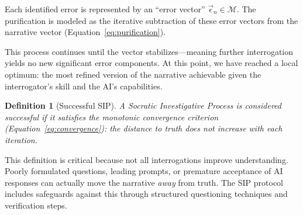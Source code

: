 \documentclass[11pt,a4paper]{article}
\newtheorem{definition}{Definition}[section]
\begin{document}
\begin{small}
Each identified error is represented by an ``error vector'' $\vec{\epsilon}_n \in \mathcal{M}$. The purification is modeled as the iterative subtraction of these error vectors from the narrative vector (Equation~\ref{eq:purification}).

This process continues until the vector stabilizes---meaning further interrogation yields no new significant error components. At this point, we have reached a local optimum: the most refined version of the narrative achievable given the interrogator's skill and the AI's capabilities.

\begin{definition}[Successful SIP]
A Socratic Investigative Process is considered successful if it satisfies the monotonic convergence criterion (Equation~\ref{eq:convergence}): the distance to truth does not increase with each iteration.
\end{definition}


This definition is critical because not all interrogations improve understanding. Poorly formulated questions, leading prompts, or premature acceptance of AI responses can actually move the narrative \textit{away} from truth. The SIP protocol includes safeguards against this through structured questioning techniques and verification steps.

\begin{figure}[ht]
\centering
{}
\end{figure}
\end{small}
\end{document}
